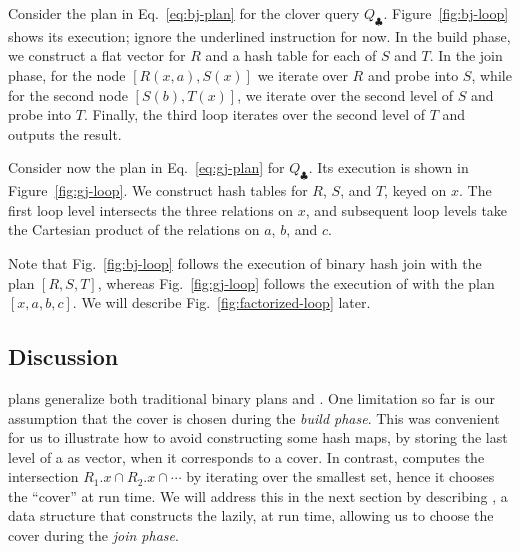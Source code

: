 \begin{example}\label{ex:binary-free-join}
  Consider the plan in Eq.~\eqref{eq:bj-plan} for the clover query $Q_\clubsuit$.
  Figure~\ref{fig:bj-loop} shows its execution; ignore the underlined
  instruction for now.
  In the build phase, 
    we construct a flat vector for $R$ and a hash table for each of $S$ and $T$.
  In the join phase, for the  node $[R(x, a), S(x)]$  we 
   iterate over $R$ and probe into $S$, while for the second node $[S(b), T(x)]$,
    we iterate over the second level of $S$ and probe into $T$.
  Finally, the third loop iterates over the second level of $T$ and outputs the result.
\end{example}

\begin{example}\label{ex:generic-free-join}
  Consider now the plan in Eq.~\eqref{eq:gj-plan} for  $Q_\clubsuit$.
  Its execution is shown in Figure~\ref{fig:gj-loop}.
  We construct  hash tables for $R$, $S$, and $T$, keyed on $x$.
  The first loop level intersects the three relations on $x$, 
    and subsequent loop levels take the Cartesian product of the relations on $a$, $b$, and $c$.
\end{example}

Note that Fig.~\ref{fig:bj-loop}
  follows the execution of binary hash join with the plan $[R, S, T]$,
  whereas Fig.~\ref{fig:gj-loop} follows the execution of \GJ
   with the plan $[x, a, b, c]$.  We will describe
   Fig.~\ref{fig:factorized-loop} later.

\subsection{Discussion}

\FJ plans generalize both traditional binary plans and \GJ.  
One
limitation so far is our assumption that the cover is chosen during
the {\em build phase}.  This was convenient for us to illustrate how
to avoid constructing some hash maps, by storing the last level of a
\GHT as vector, when it corresponds to a cover.  In contrast, \GJ
computes the intersection $R_1.x\cap R_2.x\cap \cdots$ by iterating
over the smallest set, hence it chooses the ``cover'' at run time.  We
will address this in the next section by describing \COLT, a data
structure that constructs the \GHT lazily, at run time, allowing us to
choose the cover during the {\em join phase}.
